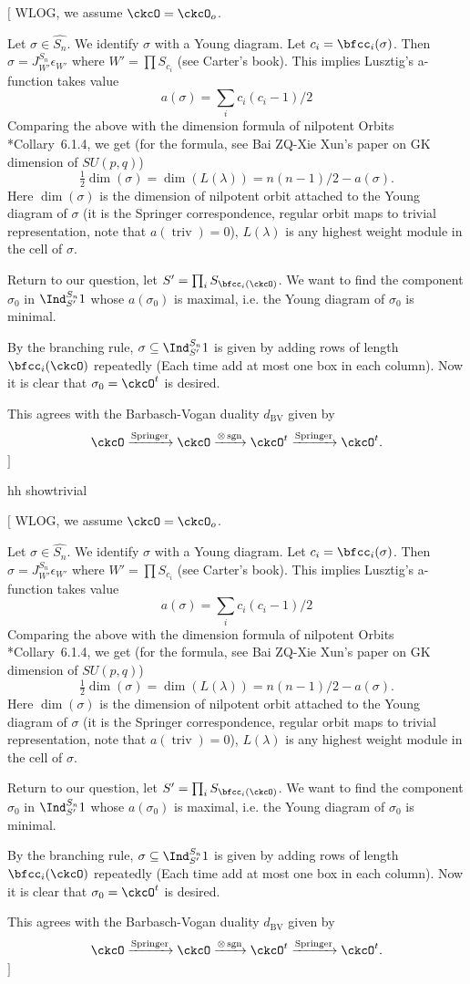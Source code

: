 \documentclass[12pt]{amsart}
\newcommand{\trivial}[2][]{\if\relax\detokenize{#1}\relax
  {%
      \color{orange} \vspace{0em}$[$#2$]$
      \color{black}
  }
  \else
\ifx#1h
\ifcsname showtrivial\endcsname
{%
    \color{orange}\vspace{0em}$[$#2$]$
    \color{black}
}
\fi
\else {\red Wrong argument!} \fi
\fi
}
\def\subset{\subseteq}
\def\abs#1{\left|{#1}\right|}
\newcommand{\sgn}{\operatorname{sgn}}
\newcommand{\triv}{\operatorname{triv}}
\numberwithin{equation}{section}
\theoremstyle{remark}
\def\half{{\tfrac{1}{2}}}
\def\dBV{d_{\mathrm{BV}}}
\def\lamck{\lambda_\ckcO}
\def\Wint#1{W_{[#1]}}
\def\Spr{\mathrm{Springer}}
\begin{document}
\trivial[h]{ WLOG, we assume $\ckcO = \ckcO_o$.

  Let $\sigma\in \widehat{S_n}$. We identify $\sigma$ with a Young diagram. Let
  $c_i = \bfcc_i(\sigma)$. Then $\sigma = J^{S_n}_{W'} \epsilon_{W'}$ where
  $W' = \prod S_{c_i}$ (see Carter's book). This implies Lusztig's a-function
  takes value
  \[
    a(\sigma) = \sum_i c_i(c_i-1) /2
  \]
  Comparing the above with the dimension formula of nilpotent Orbits
  \cite{CM}*{Collary~6.1.4}, we get (for the formula, see Bai ZQ-Xie Xun's paper
  on GK dimension of $SU(p,q)$)
  \[
    \half \dim(\sigma) = \dim(L(\lambda)) = n(n-1)/2 - a(\sigma).
  \]
  Here $\dim(\sigma)$ is the dimension of nilpotent orbit attached to the Young
  diagram of $\sigma$ (it is the Springer correspondence, regular orbit maps to
  trivial representation, note that $a(\triv)=0$), $L(\lambda)$ is any highest
  weight module in the cell of $\sigma$.


  Return to our question, let $S' = \prod_i S_{\bfcc_i(\ckcO)}$. We want to find
  the component $\sigma_0$ in $\Ind_{S'}^{S_n} 1$ whose $a(\sigma_0)$ is
  maximal, i.e. the Young diagram of $\sigma_0$ is minimal.

  By the branching rule, $\sigma \subset \Ind_{S'}^{S_n} 1$ is given by adding
  rows of length $\bfcc_i(\ckcO)$ repeatedly (Each time add at most one box in
  each column). Now it is clear that $\sigma_0 = \ckcO^t$ is desired.

  This agrees with the Barbasch-Vogan duality $\dBV$ given by
  \[
    \ckcO \xrightarrow{\Spr}\ckcO \xrightarrow{\otimes \sgn} \ckcO^t \xrightarrow{\Spr} \ckcO^t.
  \]
}
\end{document}
